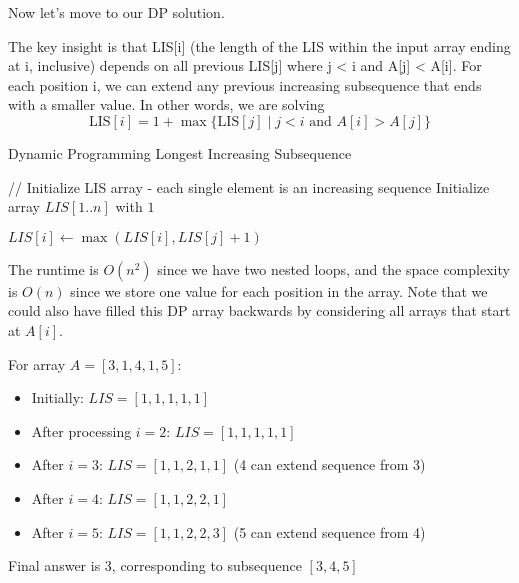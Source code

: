   Now let's move to our DP solution. 

  \begin{algo}
    The key insight is that LIS[i] (the length of the LIS within the input array ending at i, inclusive) depends on all previous LIS[j] where j < i and A[j] < A[i]. For each position i, we can extend any previous increasing subsequence that ends with a smaller value. In other words, we are solving 
    \begin{equation}
      \mathrm{LIS}[i] = 1 + \max\{\mathrm{LIS}[j] \mid j < i \text{ and } A[i] > A[j] \}
    \end{equation}

    \begin{algorithm}[H]
      \caption{Dynamic Programming Longest Increasing Subsequence}
      \label{alg:dplis}
      \begin{algorithmic}
          \State // Initialize LIS array - each single element is an increasing sequence
          \State Initialize array $LIS[1..n]$ with $1$  
          
            
              
                
                \State $LIS[i] \gets \max(LIS[i], LIS[j] + 1)$  
              \EndIf
            \EndFor
          \EndFor
          
          \State {} 
        \EndFunction
      \end{algorithmic}
    \end{algorithm}

    The runtime is $O(n^2)$ since we have two nested loops, and the space complexity is $O(n)$ since we store one value for each position in the array. Note that we could also have filled this DP array backwards by considering all arrays that start at $A[i]$. 
  \end{algo}

  \begin{example}
    For array $A = [3,1,4,1,5]$:
    \begin{itemize}
      \item Initially: $LIS = [1,1,1,1,1]$
      \item After processing $i=2$: $LIS = [1,1,1,1,1]$
      \item After $i=3$: $LIS = [1,1,2,1,1]$ (4 can extend sequence from 3)
      \item After $i=4$: $LIS = [1,1,2,2,1]$
      \item After $i=5$: $LIS = [1,1,2,2,3]$ (5 can extend sequence from 4)
    \end{itemize}
    Final answer is 3, corresponding to subsequence $[3,4,5]$
  \end{example}

